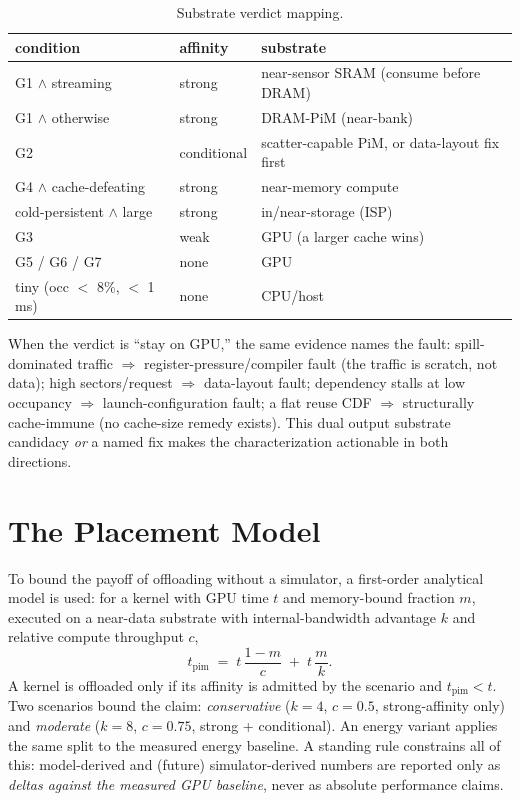 \begin{table}[t]
\centering
\caption{Substrate verdict mapping.}
\label{tab:verdict}
\begin{tabular}{@{}lll@{}}
\toprule
condition & affinity & substrate \\
\midrule
G1 $\wedge$ streaming & strong & near-sensor SRAM (consume before DRAM) \\
G1 $\wedge$ otherwise & strong & DRAM-PiM (near-bank) \\
G2 & conditional & scatter-capable PiM, or data-layout fix first \\
G4 $\wedge$ cache-defeating & strong & near-memory compute \\
cold-persistent $\wedge$ large & strong & in/near-storage (ISP) \\
G3 & weak & GPU (a larger cache wins) \\
G5 / G6 / G7 & none & GPU \\
tiny (occ $<$ 8\%, $<$ 1\,ms) & none & CPU/host \\
\bottomrule
\end{tabular}
\end{table}

When the verdict is ``stay on GPU,'' the same evidence names the fault: spill-dominated traffic $\Rightarrow$ register-pressure/compiler fault (the traffic is scratch, not data); high sectors/request $\Rightarrow$ data-layout fault; dependency stalls at low occupancy $\Rightarrow$ launch-configuration fault; a flat reuse CDF $\Rightarrow$ structurally cache-immune (no cache-size remedy exists). This dual output substrate candidacy \emph{or} a named fix makes the characterization actionable in both directions.

\section{The Placement Model}
\label{sec:met-model}

To bound the payoff of offloading without a simulator, a first-order analytical model is used: for a kernel with GPU time $t$ and memory-bound fraction $m$, executed on a near-data substrate with internal-bandwidth advantage $k$ and relative compute throughput $c$,
\begin{equation}
t_{\text{pim}} \;=\; t\,\frac{1-m}{c} \;+\; t\,\frac{m}{k}.
\label{eq:placement}
\end{equation}
A kernel is offloaded only if its affinity is admitted by the scenario and $t_{\text{pim}} < t$. Two scenarios bound the claim: \emph{conservative} ($k{=}4$, $c{=}0.5$, strong-affinity only) and \emph{moderate} ($k{=}8$, $c{=}0.75$, strong + conditional). An energy variant applies the same split to the measured energy baseline. A standing rule constrains all of this: model-derived and (future) simulator-derived numbers are reported only as \emph{deltas against the measured GPU baseline}, never as absolute performance claims.


